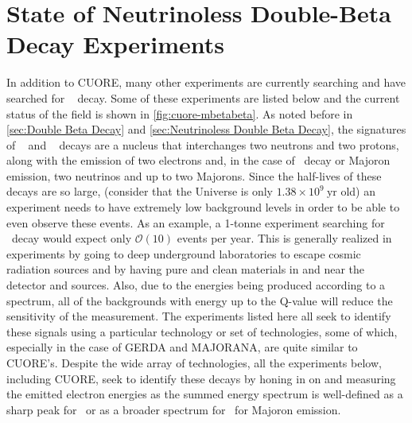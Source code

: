 \section{State of Neutrinoless Double-Beta Decay Experiments}
\label{sec:State of Neutrinoless Double Beta Decay Experiments}
In addition to CUORE, many other experiments are currently searching and have searched for \zeronubb~ decay. Some of these experiments are listed below and the current status of the field is shown in \autoref{fig:cuore-mbetabeta}.
As noted before in \autoref{sec:Double Beta Decay} and \autoref{sec:Neutrinoless Double Beta Decay}, the signatures of \zeronubb~ and \twonubb~ decays are a nucleus that interchanges two neutrons and two protons, along with the emission of two electrons and, in the case of \twonubb~decay or Majoron emission, two neutrinos and up to two Majorons.
Since the half-lives of these decays are so large, (consider that the Universe is only $1.38\times10^{9}~\textrm{yr}$ old) an experiment needs to have extremely low background levels in order to be able to even observe these events.
As an example, a 1-tonne experiment searching for \zeronubb~decay would expect only $\mathcal{O}(10)$ events per year.
This is generally realized in experiments by going to deep underground laboratories to escape cosmic radiation sources and by having pure and clean materials in and near the detector and sources.
Also, due to the energies being produced according to a spectrum, all of the backgrounds with energy up to the Q-value will reduce the sensitivity of the measurement.
The experiments listed here all seek to identify these signals using a particular technology or set of technologies, some of which, especially in the case of GERDA and MAJORANA, are quite similar to CUORE's.
Despite the wide array of technologies, all the experiments below, including CUORE, seek to identify these decays by honing in on and measuring the emitted electron energies as the summed energy spectrum is well-defined as a sharp peak for \zeronubb~or as a broader spectrum for \twonubb~for Majoron emission.

